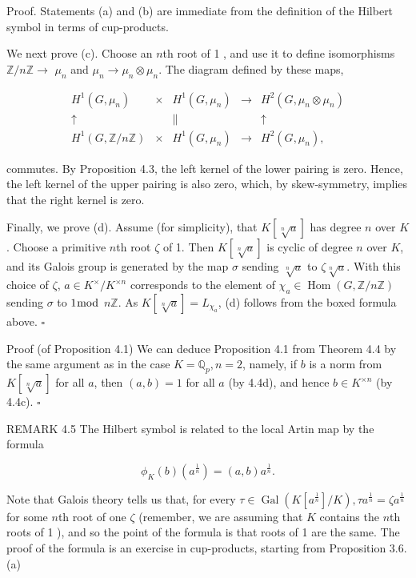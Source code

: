 \documentclass[10pt]{article}
\begin{document}
Proof. Statements (a) and (b) are immediate from the definition of the Hilbert symbol in terms of cup-products.

We next prove (c). Choose an $n$th root of 1 , and use it to define isomorphisms $\mathbb{Z} / n \mathbb{Z} \rightarrow$ $\mu_{n}$ and $\mu_{n} \rightarrow \mu_{n} \otimes \mu_{n}$. The diagram defined by these maps,

$$
\begin{array}{ccccc}
H^{1}\left(G, \mu_{n}\right) & \times & H^{1}\left(G, \mu_{n}\right) & \rightarrow & H^{2}\left(G, \mu_{n} \otimes \mu_{n}\right) \\
\uparrow & & \| & & \uparrow \\
H^{1}(G, \mathbb{Z} / n \mathbb{Z}) & \times & H^{1}\left(G, \mu_{n}\right) & \rightarrow & H^{2}\left(G, \mu_{n}\right),
\end{array}
$$

commutes. By Proposition 4.3, the left kernel of the lower pairing is zero. Hence, the left kernel of the upper pairing is also zero, which, by skew-symmetry, implies that the right kernel is zero.

Finally, we prove (d). Assume (for simplicity), that $K[\sqrt[n]{a}]$ has degree $n$ over $K$. Choose a primitive $n$th root $\zeta$ of 1. Then $K[\sqrt[n]{a}]$ is cyclic of degree $n$ over $K$, and its Galois group is generated by the map $\sigma$ sending $\sqrt[n]{a}$ to $\zeta \sqrt[n]{a}$. With this choice of $\zeta$, $a \in K^{\times} / K^{\times n}$ corresponds to the element of $\chi_{a} \in \operatorname{Hom}(G, \mathbb{Z} / n \mathbb{Z})$ sending $\sigma$ to $1 \bmod$ $n \mathbb{Z}$. As $K[\sqrt[n]{a}]=L_{\chi_{a}}$, (d) follows from the boxed formula above. \(\square\)

Proof (of Proposition 4.1) We can deduce Proposition 4.1 from Theorem 4.4 by the same argument as in the case $K=\mathbb{Q}_{p}, n=2$, namely, if $b$ is a norm from $K[\sqrt[n]{a}]$ for all $a$, then $(a, b)=1$ for all $a$ (by 4.4d), and hence $b \in K^{\times n}$ (by 4.4c). \(\square\)

REMARK 4.5 The Hilbert symbol is related to the local Artin map by the formula

$$
\phi_{K}(b)\left(a^{\frac{1}{n}}\right)=(a, b) a^{\frac{1}{n}} .
$$

Note that Galois theory tells us that, for every $\tau \in \operatorname{Gal}\left(K\left[a^{\frac{1}{n}}\right] / K\right), \tau a^{\frac{1}{n}}=\zeta a^{\frac{1}{n}}$ for some $n$th root of one $\zeta$ (remember, we are assuming that $K$ contains the $n$th roots of 1 ), and so the point of the formula is that roots of 1 are the same. The proof of the formula is an exercise in cup-products, starting from Proposition 3.6.(a)
\end{document}
